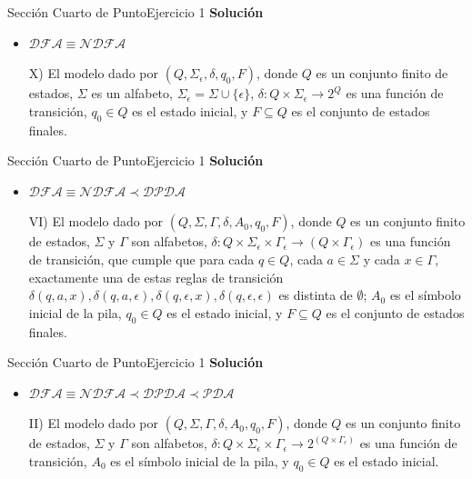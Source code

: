 \documentclass[10pt, envcountsect, presentation, aspectratio=169]{beamer}
\begin{document}

\begin{frame}{Sección Cuarto de Punto}{Ejercicio 1}
    \textbf{Solución}\\
    \begin{itemize}
        \item $\mathcal{DFA} \equiv \mathcal{NDFA}$
        \item[X)] El modelo dado por  $(Q,\Sigma_\epsilon,\delta,q_0,F)$, donde  $Q$ es un   conjunto finito de estados, $\Sigma$ es un alfabeto, $\Sigma_\epsilon=\Sigma \cup \{\epsilon\}$, $\delta:Q\times \Sigma_\epsilon\rightarrow 2^{Q}$ es una función de transición, $q_0\in Q$ es el  estado inicial, y $F\subseteq Q$ es el conjunto de estados finales.
    \end{itemize}
\end{frame}


\begin{frame}{Sección Cuarto de Punto}{Ejercicio 1}
    \textbf{Solución}\\
    \begin{itemize}
        \item $\mathcal{DFA} \equiv \mathcal{NDFA} \prec \mathcal{DPDA}$
        \item[VI)] El modelo dado por $(Q,\Sigma,\Gamma,\delta,A_0,q_0,F)$, donde  $Q$ es un conjunto finito de estados, $\Sigma$ y $\Gamma$ son alfabetos, $\delta:Q\times \Sigma_\epsilon\times\Gamma_\epsilon\rightarrow(Q\times\Gamma_\epsilon)$ es  una función de transición, que cumple que para cada $q \in Q$, cada $a \in \Sigma$ y cada $x \in \Gamma$, exactamente una de estas reglas de transición $\delta(q,a,x),\delta(q,a,\epsilon),\delta(q,\epsilon,x),\delta(q,\epsilon,\epsilon)$ es distinta de  $\emptyset$; $A_0$ es el símbolo inicial de la pila, $q_0\in Q$ es el estado inicial, y $F\subseteq Q$ es el conjunto de  estados finales.
    \end{itemize}
\end{frame}


\begin{frame}{Sección Cuarto de Punto}{Ejercicio 1}
    \textbf{Solución}\\
    \begin{itemize}
        \item $\mathcal{DFA} \equiv \mathcal{NDFA} \prec \mathcal{DPDA} \prec \mathcal{PDA}$
        \item[II)] El modelo dado por $(Q,\Sigma,\Gamma,\delta,A_0,q_0,F)$, donde  $Q$ es un conjunto finito de estados,  $\Sigma$ y $\Gamma$ son alfabetos, $\delta:Q\times \Sigma_\epsilon\times\Gamma_\epsilon\rightarrow 2^{(Q\times\Gamma_\epsilon)}$ es  una función de transición, $A_0$ es el símbolo inicial de la pila, y $q_0\in Q$ es el estado inicial. 
    \end{itemize}
\end{frame}
\end{document}

